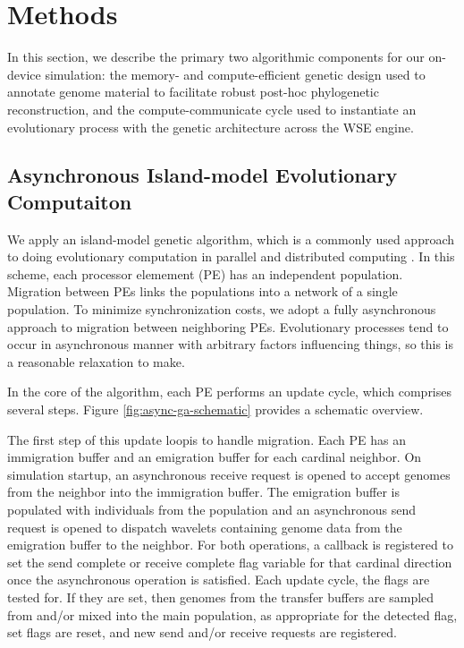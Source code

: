 \section{Methods} \label{sec:methods}

In this section, we describe the primary two algorithmic components for our on-device simulation: the memory- and compute-efficient genetic design used to annotate genome material to facilitate robust post-hoc phylogenetic reconstruction, and the compute-communicate cycle used to instantiate an evolutionary process with the genetic architecture across the WSE engine.

\subsection{Asynchronous Island-model Evolutionary Computaiton}

We apply an island-model genetic algorithm, which is a commonly used approach to doing evolutionary computation in parallel and distributed computing \citep{kozaTODO}.
In this scheme, each processor elemement (PE) has an independent population.
Migration between PEs links the populations into a network of a single population.
To minimize synchronization costs, we adopt a fully asynchronous approach to migration between neighboring PEs.
Evolutionary processes tend to occur in asynchronous manner with arbitrary factors influencing things, so this is a reasonable relaxation to make.



In the core of the algorithm, each PE performs an update cycle, which comprises several steps.
Figure \ref{fig:async-ga-schematic} provides a schematic overview.

The first step of this update loopis to handle migration.
Each PE has an immigration buffer and an emigration buffer for each cardinal neighbor.
On simulation startup, an asynchronous receive request is opened to accept genomes from the neighbor into the immigration buffer.
The emigration buffer is populated with individuals from the population and an asynchronous send request is opened to dispatch wavelets containing genome data from the emigration buffer to the neighbor.
For both operations, a callback is registered to set the send complete or receive complete flag variable for that cardinal direction once the asynchronous operation is satisfied.
Each update cycle, the flags are tested for.
If they are set, then genomes from the transfer buffers are sampled from and/or mixed into the main population, as appropriate for the detected flag, set flags are reset, and new send and/or receive requests are registered.

